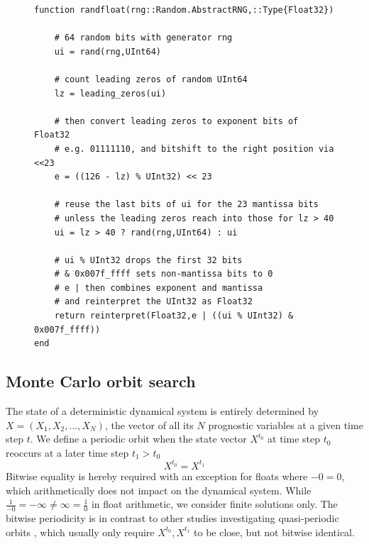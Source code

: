 \begin{figure}[tbhp]
\begin{lstlisting}[language=JuliaLocal,label=lst:randfloat,caption={\textbf{An improved random number generator (RNG) for uniformly
distributed floats.} The Julia function \texttt{randfloat} takes \texttt{rng} as an argument for an RNG for 64-bit unsigned integers \texttt{UInt64}.
\texttt{\%} is the remainder after division, for unsigned integers effectively converting between unsigned integers by adding leading
zeros or discarding leading bits. \texttt{?} indicates a one-line if-clause. \texttt{\&} is the bitwise logical and-operation. \texttt{$\vert$}
is the bitwise logical or-operation.}]
function randfloat(rng::Random.AbstractRNG,::Type{Float32})

    # 64 random bits with generator rng
    ui = rand(rng,UInt64)

    # count leading zeros of random UInt64
    lz = leading_zeros(ui)

    # then convert leading zeros to exponent bits of Float32
    # e.g. 01111110, and bitshift to the right position via <<23
    e = ((126 - lz) % UInt32) << 23

    # reuse the last bits of ui for the 23 mantissa bits
    # unless the leading zeros reach into those for lz > 40
    ui = lz > 40 ? rand(rng,UInt64) : ui

    # ui % UInt32 drops the first 32 bits
    # & 0x007f_ffff sets non-mantissa bits to 0
    # e | then combines exponent and mantissa
    # and reinterpret the UInt32 as Float32
    return reinterpret(Float32,e | ((ui % UInt32) & 0x007f_ffff))
end
\end{lstlisting}
\end{figure}

\subsection{Monte Carlo orbit search}
\label{sec:orbit_search}

The state of a deterministic dynamical system is entirely determined by $X = (X_1,X_2,...,X_N)$, the vector of all its $N$
prognostic variables at a given time step $t$. We define a periodic orbit when the state vector $X^{t_0}$ at time step $t_0$
reoccurs at a later time step $t_1 > t_0$
\begin{equation}
	X^{t_0} = X^{t_1}
	\label{eq:periodic_orbit}
\end{equation}
Bitwise equality is hereby required with an exception for floats where $-0 = 0$, which arithmetically does not impact on the
dynamical system. While $\tfrac{1}{-0} = -\infty \neq \infty = \tfrac{1}{0}$ in float arithmetic, we consider finite solutions only.
The bitwise periodicity is in contrast to other studies investigating quasi-periodic orbits \citep{Urminsky2010,Yalniz2021},
which usually only require $X^{t_0}, X^{t_1}$ to be close, but not bitwise identical.

